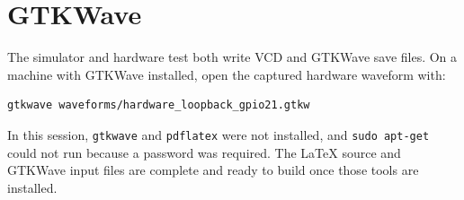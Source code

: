 \documentclass[11pt]{article}
\begin{document}
\section{GTKWave}

The simulator and hardware test both write VCD and GTKWave save files.  On a
machine with GTKWave installed, open the captured hardware waveform with:

\begin{verbatim}
gtkwave waveforms/hardware_loopback_gpio21.gtkw
\end{verbatim}

In this session, \texttt{gtkwave} and \texttt{pdflatex} were not installed, and
\texttt{sudo apt-get} could not run because a password was required.  The
LaTeX source and GTKWave input files are complete and ready to build once those
tools are installed.
\end{document}
